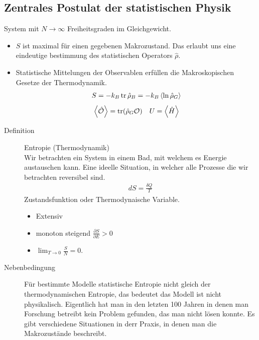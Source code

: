 \documentclass[11pt]{article}
\theoremstyle{plain}
\newcommand{\pd}[2]{\frac{\partial #1 }{\partial #2}}
\newcommand{\trace}{\operatorname{tr}}
\begin{document}
\subsection*{Zentrales Postulat der statistischen Physik}
System mit $N\to \infty$ Freiheitsgraden im Gleichgewicht.
\begin{itemize}
  \item $S$ ist maximal f\"ur einen gegebenen Makrozustand. Das erlaubt uns
    eine eindeutige bestimmung des statistischen Operators $\hat{\rho}$.
  \item Statistische Mittelungen der Observablen erf\"ullen die Makroskopischen
    Gesetze der Thermodynamik.
    \begin{align*}
      S = -k_B \trace \hat{\rho}_B = - k_B \Braket{\ln{\hat{\rho}_G}} \\
    \end{align*}
    \begin{align*}
      \Braket{\hat{\cal{O}}}= \trace (\hat{\rho}_G \mathcal{O}) &&
      U = \Braket{\hat{H}}
    \end{align*}

\end{itemize}
\begin{description}
  \item[Definition] Entropie (Thermodynamik) \\
    Wir betrachten ein System in einem Bad, mit welchem es Energie austauschen
    kann. Eine ideelle Situation, in welcher alle Prozesse die wir betrachten 
    reversibel sind. 
    \begin{align*}
      dS = \frac{\delta Q}{T}
    \end{align*}
    Zustandsfunktion oder Thermodynaische Variable.
    \begin{itemize}
      \item Extensiv
      \item monoton steigend $\pd{S}{E} > 0$
      \item $ \lim_{T \to 0} \frac{S}{N} = 0$.
    \end{itemize}
\end{description}
\begin{description}
  \item[Nebenbedingung] F\"ur bestimmte Modelle statistische Entropie nicht
    gleich der thermodynamischen Entropie, das bedeutet das Modell ist nicht
    physikalisch. Eigentlich hat man in den letzten 100 Jahren in denen man
    Forschung betreibt kein Problem gefunden, das man nicht l\"osen konnte.
    Es gibt verschiedene Situationen in derr Praxis, in denen man die Makrozust\"ande
    beschreibt. 
\end{description}
\end{document}

